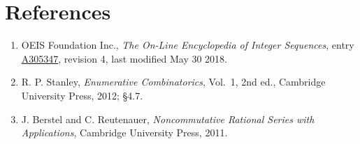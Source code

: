 \documentclass[11pt]{article}
\theoremstyle{definition}
\begin{document}
\section{References}

\begin{enumerate}

\item OEIS Foundation Inc., \emph{The On-Line Encyclopedia of Integer Sequences}, entry \href{https://oeis.org/A305347}{A305347}, revision 4, last modified May 30 2018.

\item R. P. Stanley, \emph{Enumerative Combinatorics}, Vol.~1, 2nd ed., Cambridge University Press, 2012; \S4.7.

\item J. Berstel and C. Reutenauer, \emph{Noncommutative Rational Series with Applications}, Cambridge University Press, 2011.

\end{enumerate}
\end{document}

